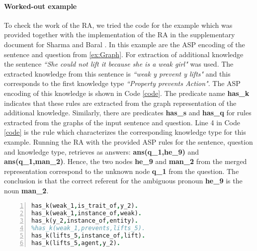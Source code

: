 \paragraph{Worked-out example} To check the work of the RA, we tried the code for the example which was provided together with the implementation of the RA in the supplementary document for Sharma and Baral \cite{2018CommonsenseKT}. In this example are the ASP encoding of the sentence and question from \ref{ex:Graph}.
For extraction of additional knowledge the sentence \textit{``She could not lift it because she is a weak girl"} was used. The extracted knowledge from this sentence is \textit{``weak y prevent y lifts"} and this corresponds to the first knowledge type \textit{``Property prevents Action"}. The ASP encoding of this knowledge is shown in Code \ref{code}. The predicate name \textbf{has\_k} indicates that these rules are extracted from the graph representation of the additional knowledge. Similarly, there are predicates \textbf{has\_s} and \textbf{has\_q} for rules extracted from the graphs of the input sentence and question. Line 4 in Code \ref{code} is the rule which characterizes the corresponding knowledge type for this example. Running the RA with the provided ASP rules for the sentence, question and knowledge type, retrieves as answers: \textbf{ans(q\_1,he\_9)} and \textbf{ans(q\_1,man\_2)}. Hence, the two nodes \textbf{he\_9} and \textbf{man\_2} from the merged representation correspond to the unknown node \textbf{q\_1} from the question. The conclusion is that the correct referent for the ambiguous pronoun \textbf{he\_9} is the noun \textbf{man\_2}. 

\pagebreak
\begin{lstlisting}[language = Prolog, style=SC, caption={``weak y prevents y lifts"},label=code,numbers=left,
numberstyle=\tiny ]
has_k(weak_1,is_trait_of,y_2).
has_k(weak_1,instance_of,weak).
has_k(y_2,instance_of,entity).
%has_k(weak_1,prevents,lifts_5).
has_k(lifts_5,instance_of,lift).
has_k(lifts_5,agent,y_2).
\end{lstlisting}


